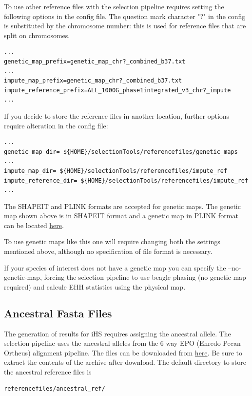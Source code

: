 \documentclass[a4paper,10pt]{article}
\begin{document}
To use other reference files with the selection pipeline requires
setting the following options in the config file. The question mark character
"?" in the config is substituted by the chromosome number: this is
used for reference files that are split on chromosomes.\\

\begin{verbatim}
...
genetic_map_prefix=genetic_map_chr?_combined_b37.txt
...
impute_map_prefix=genetic_map_chr?_combined_b37.txt
impute_reference_prefix=ALL_1000G_phase1integrated_v3_chr?_impute
...
\end{verbatim}

\noindent
If you decide to store the reference files in another location,
further options require alteration in the config file:\\ 
\begin{verbatim}
...
genetic_map_dir= ${HOME}/selectionTools/referencefiles/genetic_maps
...
impute_map_dir= ${HOME}/selectionTools/referencefiles/impute_ref
impute_reference_dir= ${HOME}/selectionTools/referencefiles/impute_ref
...
\end{verbatim}

\noindent
The SHAPEIT and PLINK formats are accepted for genetic maps.
The genetic map shown above is in SHAPEIT format and a genetic map in PLINK format can be located
\href{http://bochet.gcc.biostat.washington.edu/beagle/genetic_maps/plink.GRCh37.map.zip}{here}.

To use genetic maps like this one will require changing both the settings mentioned above, although
no specification of file format is necessary.

If your species of interest does not have a genetic map you can specify the --no-genetic-map, forcing
the selection pipeline to use beagle phasing (no genetic map required) and calcule EHH statistics using
the physical map.  

\subsection{Ancestral Fasta Files}
The generation of results for iHS requires assigning the ancestral
allele. The selection pipeline uses the ancestral alleles from the
6-way EPO (Enredo-Pecan-Ortheus) alignment pipeline. The files can be
downloaded from
\href{ftp://ftp.1000genomes.ebi.ac.uk/vol1/ftp/phase1/analysis_results/supporting/ancestral_alignments/human_ancestor_GRCh37_e59.tar.bz2}{here}. Be
sure to extract the contents of the archive after download. The default
directory to store the ancestral reference files is\\
\begin{verbatim}
referencefiles/ancestral_ref/
\end{verbatim}
\end{document}
